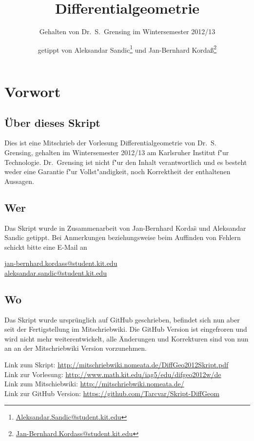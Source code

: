 \documentclass[paper=A4, twoside, chapterprefix=true, bibliography=totoc, headsepline]{scrbook}
\title{Differentialgeometrie}
\subtitle{Gehalten von Dr.~S.~Grensing im Wintersemester 2012/13}
\author{getippt von Aleksandar Sandic\thanks{\href{mailto:aleksandar.sandic@student.kit.edu}{Aleksandar.Sandic@student.kit.edu}} und Jan-Bernhard Korda\ss\thanks{\href{mailto:jan-bernhard.kordass@student.kit.edu}{Jan-Bernhard.Kordass@student.kit.edu}}}
\theoremstyle{plain}
\theoremstyle{nonumberplain}
\theoremstyle{empty}
\theoremstyle{break}
\newcommand{\quot}[1]{\textrm{\glqq}{#1}\textrm{\grqq}}
\begin{document}
\maketitle

\setlength\parskip{0.6pt}
\tableofcontents

\chapter*{Vorwort}

\section*{\"Uber dieses Skript}
Dies ist eine Mitschrieb der Vorlesung \quot{Differentialgeometrie} von Dr.~S.~
Grensing, gehalten im Wintersemester 2012/13 am Karlsruher Institut f"ur
Technologie.  Dr.~Grensing ist nicht f"ur den Inhalt verantwortlich und es
besteht weder eine Garantie f"ur Vollst"andigkeit, noch Korrektheit der
enthaltenen Aussagen.

\section*{Wer}
Das Skript wurde in Zusammenarbeit von Jan-Bernhard Korda\"s und Aleksandar
Sandic getippt.  Bei Anmerkungen beziehungsweise beim Auffinden von Fehlern
schickt bitte eine E-Mail an
\begin{center}
  \href{mailto:jan-bernhard.kordass@student.kit.edu}{jan-bernhard.kordass@student.kit.edu}\\
  \href{mailto:aleksandar.sandic@student.kit.edu}{aleksandar.sandic@student.kit.edu}
\end{center}

\section*{Wo}
Das Skript wurde urspr\"unglich auf GitHub geschrieben, befindet sich nun aber
seit der Fertigstellung im Mitschriebwiki.  Die GitHub Version ist
\quot{eingefroren} und wird nicht mehr weiterentwickelt, alle \"Anderungen und
Korrekturen sind von nun an an der Mitschriebwiki Version vorzunehmen.

Link zum Skript: \url{http://mitschriebwiki.nomeata.de/DiffGeo2012Skript.pdf}\\
Link zur Vorlesung: \url{http://www.math.kit.edu/iag5/edu/difgeo2012w/de}\\
Link zum Mitschiebwiki: \url{http://mitschriebwiki.nomeata.de/}\\
Link zur GitHub Version: \url{https://github.com/Tarcvar/Skript-DiffGeom}
\end{document}
